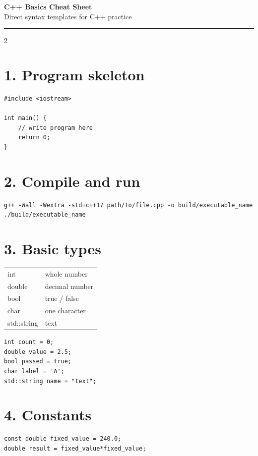 \documentclass[10pt]{article}
\begin{document}
\begin{center}
    {\LARGE \textbf{C++ Basics Cheat Sheet}}\\[2pt]
    {\small Direct syntax templates for C++ practice}
\end{center}

\hrule
\vspace{0.4em}

\begin{multicols}{2}

\section{1. Program skeleton}
\begin{lstlisting}[style=cppstyle]
#include <iostream>

int main() {
    // write program here
    return 0;
}
\end{lstlisting}

\section{2. Compile and run}
\begin{lstlisting}[style=bashstyle]
g++ -Wall -Wextra -std=c++17 path/to/file.cpp -o build/executable_name
./build/executable_name
\end{lstlisting}

\section{3. Basic types}
\begin{center}
\begin{tabular}{>{\ttfamily}l l}
\hline
int & whole number \\
double & decimal number \\
bool & true / false \\
char & one character \\
std::string & text \\
\hline
\end{tabular}
\end{center}

\begin{lstlisting}[style=cppstyle]
int count = 0;
double value = 2.5;
bool passed = true;
char label = 'A';
std::string name = "text";
\end{lstlisting}

\section{4. Constants}
\begin{lstlisting}[style=cppstyle]
const double fixed_value = 240.0;
double result = fixed_value*fixed_value;
\end{lstlisting}


\end{multicols}
\end{document}
